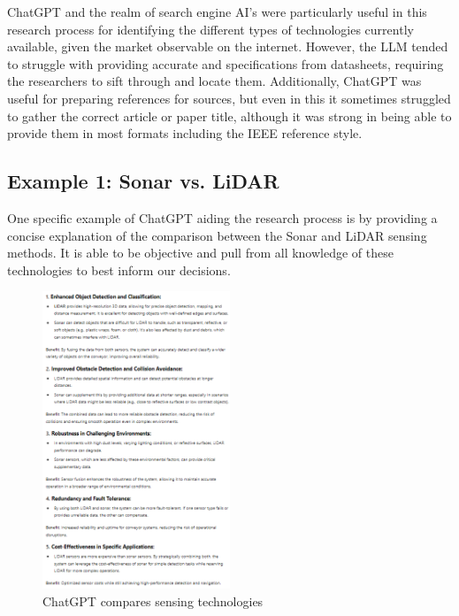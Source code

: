 \noindent ChatGPT and the realm of search engine AI's were particularly useful in this research process for identifying the different types of technologies currently available, given the market observable on the internet. However, the LLM tended to struggle with providing accurate and specifications from datasheets, requiring the researchers to sift through and locate them. Additionally, ChatGPT was useful for preparing references for sources, but even in this it sometimes struggled to gather the correct article or paper title, although it was strong in being able to provide them in most formats including the IEEE reference style.\\

\subsection{Example 1: Sonar vs. LiDAR}
\noindent One specific example of ChatGPT aiding the research process is by providing a concise explanation of the comparison between the Sonar and LiDAR sensing methods. It is able to be objective and pull from all knowledge of these technologies to best inform our decisions.\\
\begin{figure}[H]
	\centering
	\includegraphics[width=0.5\textwidth]{./Images/chatgpt1.png}
	\caption{\label{fig:chatgpt1}ChatGPT compares sensing technologies}
\end{figure}


